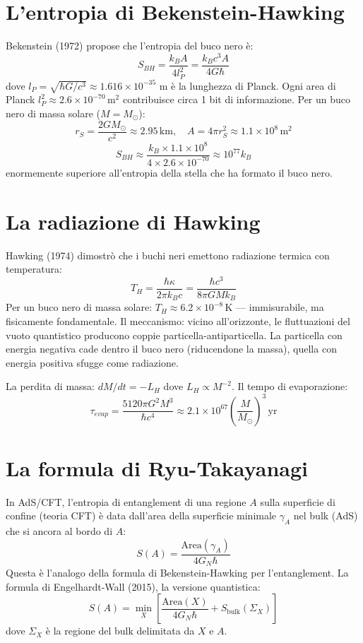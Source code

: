 \documentclass[11.5pt,a4paper,openany]{book}
\theoremstyle{remark}
\begin{document}
\section{L'entropia di Bekenstein-Hawking}

Bekenstein (1972) propose che l'entropia del buco nero è:
\[
S_{BH} = \frac{k_B A}{4 l_P^2} = \frac{k_B c^3 A}{4 G \hbar}
\]
dove $l_P = \sqrt{\hbar G/c^3} \approx 1.616 \times 10^{-35}$ m è la lunghezza di Planck. Ogni area di Planck $l_P^2 \approx 2.6 \times 10^{-70}\,\mathrm{m}^2$ contribuisce circa 1 bit di informazione. Per un buco nero di massa solare ($M = M_\odot$):
\[
r_S = \frac{2GM_\odot}{c^2} \approx 2.95\,\mathrm{km}, \quad A = 4\pi r_S^2 \approx 1.1 \times 10^8\,\mathrm{m}^2
\]
\[
S_{BH} \approx \frac{k_B \times 1.1 \times 10^8}{4 \times 2.6 \times 10^{-70}} \approx 10^{77} k_B
\]
enormemente superiore all'entropia della stella che ha formato il buco nero.

\section{La radiazione di Hawking}

Hawking (1974) dimostrò che i buchi neri emettono radiazione termica con temperatura:
\[
T_H = \frac{\hbar \kappa}{2\pi k_B c} = \frac{\hbar c^3}{8\pi G M k_B}
\]
Per un buco nero di massa solare: $T_H \approx 6.2 \times 10^{-8}\,\mathrm{K}$ — immisurabile, ma fisicamente fondamentale. Il meccanismo: vicino all'orizzonte, le fluttuazioni del vuoto quantistico producono coppie particella-antiparticella. La particella con energia negativa cade dentro il buco nero (riducendone la massa), quella con energia positiva sfugge come radiazione.

La perdita di massa: $dM/dt = -L_H$ dove $L_H \propto M^{-2}$. Il tempo di evaporazione:
\[
\tau_{evap} = \frac{5120\pi G^2 M^3}{\hbar c^4} \approx 2.1 \times 10^{67}\left(\frac{M}{M_\odot}\right)^3\,\mathrm{yr}
\]

\section{La formula di Ryu-Takayanagi}

In AdS/CFT, l'entropia di entanglement di una regione $A$ sulla superficie di confine (teoria CFT) è data dall'area della superficie minimale $\gamma_A$ nel bulk (AdS) che si ancora al bordo di $A$:
\[
S(A) = \frac{\text{Area}(\gamma_A)}{4 G_N \hbar}
\]
Questa è l'analogo della formula di Bekenstein-Hawking per l'entanglement. La formula di Engelhardt-Wall (2015), la versione quantistica:
\[
S(A) = \min_X\left[\frac{\text{Area}(X)}{4G_N\hbar} + S_{\text{bulk}}(\Sigma_X)\right]
\]
dove $\Sigma_X$ è la regione del bulk delimitata da $X$ e $A$.
\end{document}
